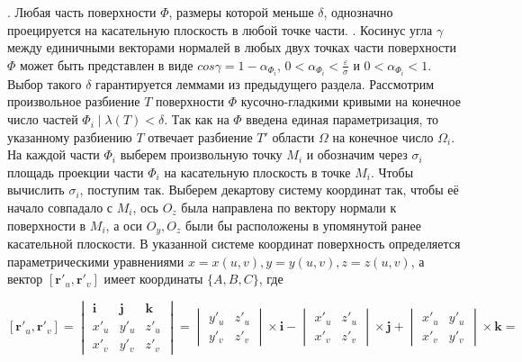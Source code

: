 \documentclass[12pt,a4paper]{article}
\begin{document}
	. Любая часть поверхности $\Phi$, размеры которой меньше $\delta$, однозначно проецируется на касательную плоскость в любой точке части. 
	. Косинус угла $\gamma$ между единичными векторами нормалей в любых двух точках части поверхности $\Phi$ может быть представлен в виде $cos\gamma = 1 - \alpha_{\Phi_{i}}$, $0 < \alpha_{\Phi_{i}} < \frac{\varepsilon}{\sigma}$ и $0 < \alpha_{\Phi_{i}} < 1$.
	\newline
	Выбор такого $\delta$ гарантируется леммами из предыдущего раздела.
	\newline
	\newline
	Рассмотрим произвольное разбиение $T$ поверхности $\Phi$ кусочно-гладкими кривыми на конечное число частей $\Phi_{i} \mid \lambda(T) < \delta$. Так как на $\Phi$ введена единая параметризация, то указанному разбиению $T$ отвечает разбиение $T'$ области $\Omega$ на конечное число $\Omega_{i}$. На каждой части $\Phi_{i}$ выберем произвольную точку $M_{i}$ и обозначим через $\sigma_{i}$ площадь проекции части $\Phi_{i}$ на касательную плоскость в точке $M_{i}$. Чтобы вычислить $\sigma_{i}$, поступим так. Выберем декартову систему координат так, чтобы её начало совпадало с $M_{i}$, ось $O_{z}$ была направлена по вектору нормали к поверхности в $M_{i}$, а оси $O_{y} , O_{z}$ были бы расположены в упомянутой ранее касательной плоскости. В указанной системе координат поверхность определяется параметрическими уравнениями $x = x(u,v), y = y(u,v), z = z(u,v)$, а вектор $\left[ \textbf{r}'_{u}, \textbf{r}'_{v} \right]$ имеет координаты $\{A, B, C\}$, где  
	
	\[ \left[ \textbf{r}'_{u}, \textbf{r}'_{v} \right] = 
	\begin{vmatrix}
		\textbf{i} & \textbf{j} & \textbf{k}\\
		x'_{u} & y'_{u} & z'_{u}\\
		x'_{v} & y'_{v} & z'_{v}
	\end{vmatrix} = 
	\begin{vmatrix}
		y'_{u} & z'_{u}\\
		y'_{v} & z'_{v}
	\end{vmatrix} \times \textbf{i} -
	\begin{vmatrix}
		x'_{u} & z'_{u}\\
		x'_{v} & z'_{v}
	\end{vmatrix} \times \textbf{j} +	
		\begin{vmatrix}
	x'_{u} & y'_{u}\\
	x'_{v} & y'_{v}
	\end{vmatrix} \times \textbf{k} =
	\]
	
\end{document}
